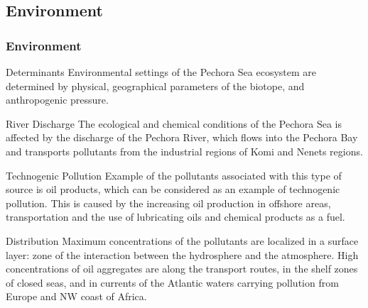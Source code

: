 \documentclass[pdflatex,compress,8pt,
	xcolor={dvipsnames,dvipsnames,svgnames,x11names,table},
	hyperref={	
	breaklinks = true, 
	pdfauthor={Lemenkova Polina}, 
	pdfsubject={Presentation}, 
	pdfcreator={Lemenkova Polina}, 
	pdfproducer={Lemenkova Polina}, 
	colorlinks=true,
	linkcolor=NavyBlue, 
	citecolor=NavyBlue, 
	urlcolor = NavyBlue, 
	breaklinks = true}]{beamer}
\begin{document}
\subsection{Environment}
\begin{frame}\frametitle{Environment}

\begin{alertblock}{Determinants}
Environmental settings of the Pechora Sea ecosystem are determined by physical, geographical parameters of the biotope, and anthropogenic pressure.
\end{alertblock}

\begin{block}{River Discharge}
The ecological and chemical conditions of the Pechora Sea is affected by the discharge of the Pechora River, which flows into the Pechora Bay and transports pollutants from the industrial regions of Komi and Nenets regions. 
\end{block}

\begin{examples}{Technogenic Pollution}
Example of the pollutants associated with this type of source is oil products, which can be considered as an example of technogenic pollution. This is caused by the increasing oil production in offshore areas, transportation and the use of lubricating oils and chemical products as a fuel.
\end{examples}

\begin{alertblock}{Distribution}
Maximum concentrations of the pollutants are localized in a surface layer: zone of the interaction between the hydrosphere and the atmosphere. High concentrations of oil aggregates are along the transport routes, in the shelf zones of closed seas, and in currents of the Atlantic waters carrying pollution from Europe and NW coast of Africa.
\end{alertblock}

\end{frame}
\end{document}
